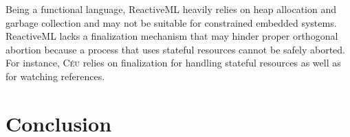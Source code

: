 \documentclass{acm_proc_article-sp}
\newcommand{\CEU}{\textsc{C\'{e}u}\xspace}
\newcommand{\1}{\;}
\newcommand{\2}{\;\;}
\newcommand{\3}{\;\;\;}
\newcommand{\5}{\;\;\;\;\;}
\begin{document}
%
Being a functional language, ReactiveML heavily relies on heap allocation and 
garbage collection and may not be suitable for constrained embedded systems.
%
%
ReactiveML lacks a finalization mechanism that may hinder proper orthogonal 
abortion because a process that uses stateful resources cannot be safely 
aborted.
For instance, \CEU relies on finalization for handling stateful resources as 
well as for watching references.

\section{Conclusion}
\label{sec.conclusion}

\end{document}
